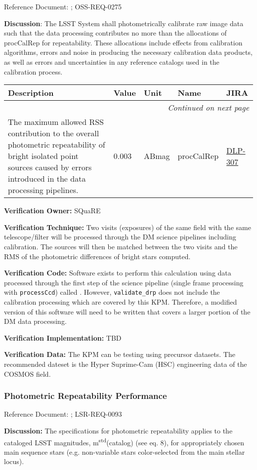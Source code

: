 \documentclass[DM,lsstdraft,toc]{lsstdoc}
\makeatletter
\newcommand{\jira}[1]{\href{https://jira.lsstcorp.org/browse/#1}{#1}}
\newenvironment{metric}[0]{%
\setlength\LTleft{0pt}
\setlength\LTright{\fill}
\begin{longtable}[]{@{}p{0.4\textwidth}lp{0.75in}p{1.3in}p{0.75in}@{}}

\hline \textbf{Description} & \textbf{Value} & \textbf{Unit} & \textbf{Name} & \textbf{JIRA} \\ \hline
\endhead

\hline \multicolumn{5}{r}{\emph{Continued on next page}} \\
\endfoot

\hline\hline
\endlastfoot
}{%
\hline
\end{longtable}
}
\makeatother
\begin{document}
Reference Document: ; OSS-REQ-0275

\textbf{Discussion}: The LSST System shall photometrically calibrate raw
image data such that the data processing contributes no more than the
allocations of procCalRep for repeatability. These allocations include
effects from calibration algorithms, errors and noise in producing the
necessary calibration data products, as well as errors and uncertainties
in any reference catalogs used in the calibration process.

\begin{metric}
The maximum allowed RSS contribution to the overall photometric
repeatability of bright isolated point sources caused by errors
introduced in the data processing pipelines. & 0.003 & ABmag &
procCalRep & \jira{DLP-307}\tabularnewline
\end{metric}

\textbf{Verification Owner:} SQuaRE

\textbf{Verification Technique:} Two visits (exposures) of the same
field with the same telescope/filter will be processed through the DM
science pipelines including calibration. The sources will then be
matched between the two visits and the RMS of the photometric
differences of bright stars computed.

\textbf{Verification Code:} Software exists to perform this calculation
using data processed through the first step of the science pipeline
(single frame processing with \texttt{processCcd}) called . However, \texttt{validate\_drp}
does not include the calibration processing which are covered by this
KPM. Therefore, a modified version of this software will need to be
written that covers a larger portion of the DM data processing.

\textbf{Verification Implementation:} TBD

\textbf{Verification Data:} The KPM can be testing using precursor
datasets. The recommended dateset is the Hyper Suprime-Cam (HSC)
engineering data of the COSMOS field.

\subsubsection{Photometric Repeatability
Performance}\label{photometric-repeatability-performance}

Reference Document: ; LSR-REQ-0093

\textbf{Discussion:} The specifications for photometric repeatability
applies to the cataloged LSST magnitudes,
m\textsuperscript{std}(catalog) (see \SRD eq. 8), for appropriately
chosen main sequence stars (e.g. non-variable stars color-selected from
the main stellar locus).
\end{document}

